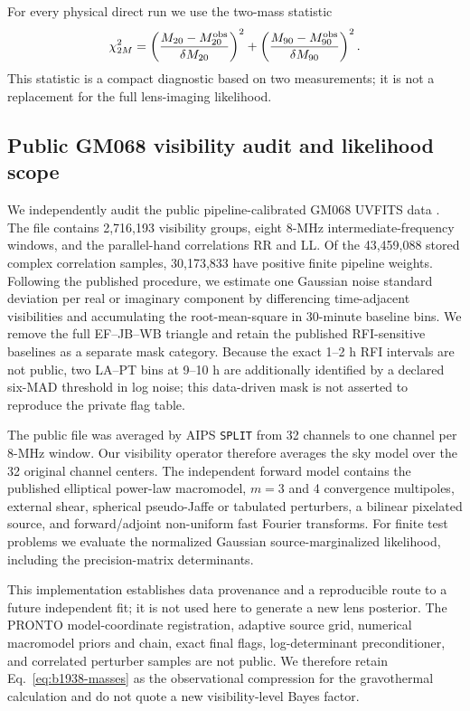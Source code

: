 \documentclass[12pt]{article}
\begin{document}
For every physical direct run we use the two-mass statistic
\begin{equation}
  \chi^2_{2M}=
  \left(\frac{M_{20}-M_{20}^{\rm obs}}{\delta M_{20}}\right)^2+
  \left(\frac{M_{90}-M_{90}^{\rm obs}}{\delta M_{90}}\right)^2.
  \label{eq:two-mass-chi2}
\end{equation}
This statistic is a compact diagnostic based on two measurements; it is not a
replacement for the full lens-imaging likelihood.

\subsection{Public GM068 visibility audit and likelihood scope}
\label{sec:visibility-audit-method}

We independently audit the public pipeline-calibrated GM068 UVFITS data
\citep{Powell2025}.  The file contains 2,716,193 visibility groups, eight
8-MHz intermediate-frequency windows, and the parallel-hand correlations RR
and LL.  Of the 43,459,088 stored complex correlation samples, 30,173,833
have positive finite pipeline weights.  Following the published procedure,
we estimate one Gaussian noise standard deviation per real or imaginary
component by differencing time-adjacent visibilities and accumulating the
root-mean-square in 30-minute baseline bins.  We remove the full EF--JB--WB
triangle and retain the published RFI-sensitive baselines as a separate mask
category.  Because the exact 1--2 h RFI intervals are not public, two LA--PT
bins at 9--10 h are additionally identified by a declared six-MAD threshold
in log noise; this data-driven mask is not asserted to reproduce the private
flag table.

The public file was averaged by AIPS \texttt{SPLIT} from 32 channels to one
channel per 8-MHz window.  Our visibility operator therefore averages the sky
model over the 32 original channel centers.  The independent forward model
contains the published elliptical power-law macromodel, $m=3$ and 4
convergence multipoles, external shear, spherical pseudo-Jaffe or tabulated
perturbers, a bilinear pixelated source, and forward/adjoint non-uniform fast
Fourier transforms.  For finite test problems we evaluate the normalized
Gaussian source-marginalized likelihood, including the precision-matrix
determinants.

This implementation establishes data provenance and a reproducible route to
a future independent fit; it is not used here to generate a new lens posterior.
The PRONTO model-coordinate registration, adaptive source grid, numerical
macromodel priors and chain, exact final flags, log-determinant preconditioner,
and correlated perturber samples are not public.  We therefore retain
Eq.~\eqref{eq:b1938-masses} as the observational compression for the
gravothermal calculation and do not quote a new visibility-level Bayes factor.
\end{document}
